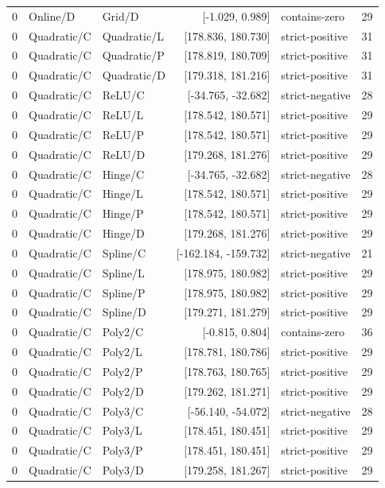 \begin{longtable}{lllrlr}
0 & Online/D & Grid/D & [-1.029, 0.989] & contains-zero & 29 \\
0 & Quadratic/C & Quadratic/L & [178.836, 180.730] & strict-positive & 31 \\
0 & Quadratic/C & Quadratic/P & [178.819, 180.709] & strict-positive & 31 \\
0 & Quadratic/C & Quadratic/D & [179.318, 181.216] & strict-positive & 31 \\
0 & Quadratic/C & ReLU/C & [-34.765, -32.682] & strict-negative & 28 \\
0 & Quadratic/C & ReLU/L & [178.542, 180.571] & strict-positive & 29 \\
0 & Quadratic/C & ReLU/P & [178.542, 180.571] & strict-positive & 29 \\
0 & Quadratic/C & ReLU/D & [179.268, 181.276] & strict-positive & 29 \\
0 & Quadratic/C & Hinge/C & [-34.765, -32.682] & strict-negative & 28 \\
0 & Quadratic/C & Hinge/L & [178.542, 180.571] & strict-positive & 29 \\
0 & Quadratic/C & Hinge/P & [178.542, 180.571] & strict-positive & 29 \\
0 & Quadratic/C & Hinge/D & [179.268, 181.276] & strict-positive & 29 \\
0 & Quadratic/C & Spline/C & [-162.184, -159.732] & strict-negative & 21 \\
0 & Quadratic/C & Spline/L & [178.975, 180.982] & strict-positive & 29 \\
0 & Quadratic/C & Spline/P & [178.975, 180.982] & strict-positive & 29 \\
0 & Quadratic/C & Spline/D & [179.271, 181.279] & strict-positive & 29 \\
0 & Quadratic/C & Poly2/C & [-0.815, 0.804] & contains-zero & 36 \\
0 & Quadratic/C & Poly2/L & [178.781, 180.786] & strict-positive & 29 \\
0 & Quadratic/C & Poly2/P & [178.763, 180.765] & strict-positive & 29 \\
0 & Quadratic/C & Poly2/D & [179.262, 181.271] & strict-positive & 29 \\
0 & Quadratic/C & Poly3/C & [-56.140, -54.072] & strict-negative & 28 \\
0 & Quadratic/C & Poly3/L & [178.451, 180.451] & strict-positive & 29 \\
0 & Quadratic/C & Poly3/P & [178.451, 180.451] & strict-positive & 29 \\
0 & Quadratic/C & Poly3/D & [179.258, 181.267] & strict-positive & 29 \\

\end{longtable}
